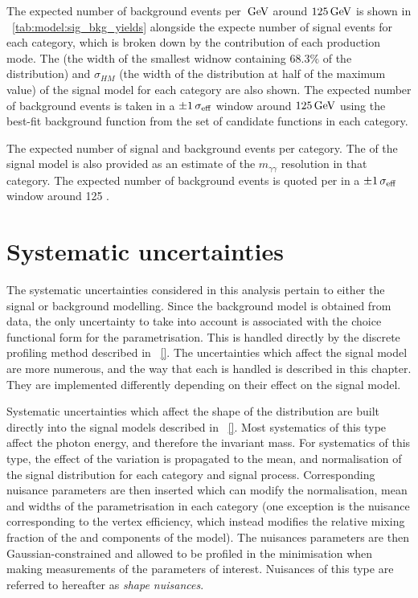 The expected number of background events per $\,\text{Ge\hspace{-.08em}V}$ around $125\,\text{Ge\hspace{-.08em}V}$ is shown in \Table~\ref{tab:model:sig_bkg_yields} alongside the expecte number of signal events for each category, which is broken down by the contribution of each production mode. The \effSigma (the width of the smallest widnow containing $68.3\%$ of the distribution) and $\sigma_{HM}$ (the width of the distribution at half of the maximum value) of the signal model for each category are also shown. The expected number of background events is taken in a $\pm 1 \,\sigma_{\text{eff}}$ window around $125\,\text{Ge\hspace{-.08em}V}$ using the best-fit background function from the set of candidate functions in each category.

 \begin{table}
  \resizebox{\textwidth}{!}{

}
 \caption{ The expected number of signal and background events per category. The \effSigma of the signal model is also provided as an estimate of the $m_{\gamma\gamma}$ resolution in that category. The expected number of background events is quoted per \GeV in a $\pm 1 \,\sigma_{\text{eff}}$ window around 125 \GeV.}
 \label{tab:model:sig_bkg_yields}
\end{table}

\section{Systematic uncertainties}
\label{model:sec:systematics}

The systematic uncertainties considered in this analysis pertain to either the signal or background modelling. Since the background model is obtained from data, the only uncertainty to take into account is associated with the choice functional form for the parametrisation. This is handled directly by the discrete profiling method described in \Sec~\ref{}. The uncertainties which affect the signal model are more numerous, and the way that each is handled is described in this chapter. They are implemented differently depending on their effect on the signal model. 

Systematic uncertainties which affect the shape of the \mgg distribution are built directly into the signal models described in \Sec~\ref{}. Most systematics of this type affect the photon energy, and therefore the invariant mass. For systematics of this type, the effect of the variation is propagated to the mean, \effSigma and normalisation of the signal \mgg distribution for each category and signal process. Corresponding nuisance parameters are then inserted which can modify the normalisation, mean and widths of the \DCBpG parametrisation in each category (one exception is the nuisance corresponding to the vertex efficiency, which instead modifies the relative mixing fraction of the \RV and \WV components of the model). The nuisances parameters are then Gaussian-constrained and allowed to be profiled in the \NLL minimisation when making measurements of the parameters of interest. Nuisances of this type are referred to hereafter as \emph{shape nuisances}. 

